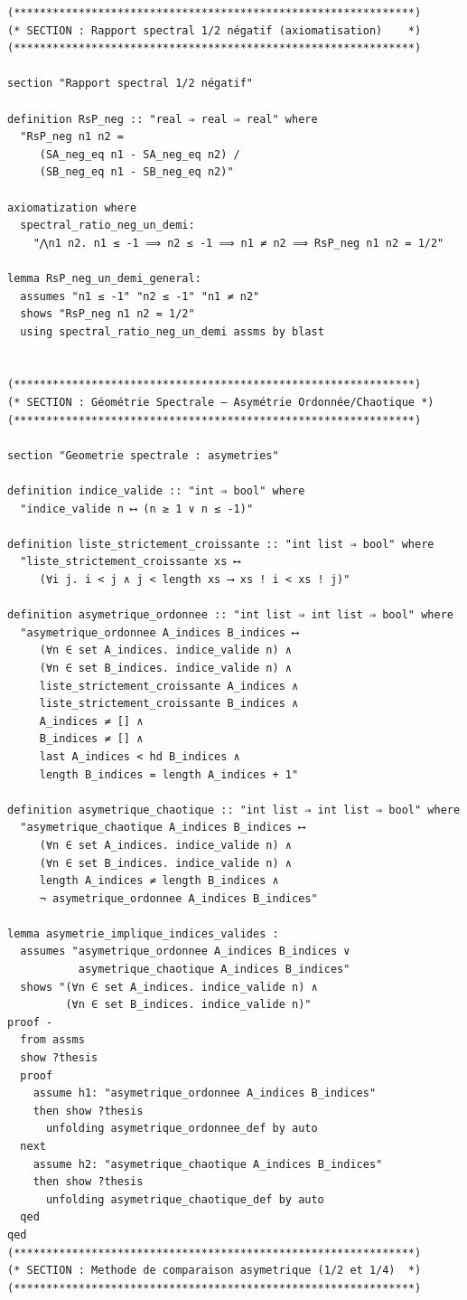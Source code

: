 \documentclass[a4paper,11pt]{article}
\begin{document}
\begin{holcode}[title={\textcolor{white}{File: methode\_spectral.thy -- Part 1/4}}]
\begin{lstlisting}
(**************************************************************)
(* SECTION : Rapport spectral 1/2 négatif (axiomatisation)    *)
(**************************************************************)

section "Rapport spectral 1/2 négatif"

definition RsP_neg :: "real ⇒ real ⇒ real" where
  "RsP_neg n1 n2 =
     (SA_neg_eq n1 - SA_neg_eq n2) /
     (SB_neg_eq n1 - SB_neg_eq n2)"

axiomatization where
  spectral_ratio_neg_un_demi:
    "⋀n1 n2. n1 ≤ -1 ⟹ n2 ≤ -1 ⟹ n1 ≠ n2 ⟹ RsP_neg n1 n2 = 1/2"

lemma RsP_neg_un_demi_general:
  assumes "n1 ≤ -1" "n2 ≤ -1" "n1 ≠ n2"
  shows "RsP_neg n1 n2 = 1/2"
  using spectral_ratio_neg_un_demi assms by blast


(**************************************************************)
(* SECTION : Géométrie Spectrale — Asymétrie Ordonnée/Chaotique *)
(**************************************************************)

section "Geometrie spectrale : asymetries"

definition indice_valide :: "int ⇒ bool" where
  "indice_valide n ⟷ (n ≥ 1 ∨ n ≤ -1)"

definition liste_strictement_croissante :: "int list ⇒ bool" where
  "liste_strictement_croissante xs ⟷
     (∀i j. i < j ∧ j < length xs ⟶ xs ! i < xs ! j)"

definition asymetrique_ordonnee :: "int list ⇒ int list ⇒ bool" where
  "asymetrique_ordonnee A_indices B_indices ⟷
     (∀n ∈ set A_indices. indice_valide n) ∧
     (∀n ∈ set B_indices. indice_valide n) ∧
     liste_strictement_croissante A_indices ∧
     liste_strictement_croissante B_indices ∧
     A_indices ≠ [] ∧
     B_indices ≠ [] ∧
     last A_indices < hd B_indices ∧
     length B_indices = length A_indices + 1"

definition asymetrique_chaotique :: "int list ⇒ int list ⇒ bool" where
  "asymetrique_chaotique A_indices B_indices ⟷
     (∀n ∈ set A_indices. indice_valide n) ∧
     (∀n ∈ set B_indices. indice_valide n) ∧
     length A_indices ≠ length B_indices ∧
     ¬ asymetrique_ordonnee A_indices B_indices"

lemma asymetrie_implique_indices_valides :
  assumes "asymetrique_ordonnee A_indices B_indices ∨
           asymetrique_chaotique A_indices B_indices"
  shows "(∀n ∈ set A_indices. indice_valide n) ∧
         (∀n ∈ set B_indices. indice_valide n)"
proof -
  from assms
  show ?thesis
  proof
    assume h1: "asymetrique_ordonnee A_indices B_indices"
    then show ?thesis
      unfolding asymetrique_ordonnee_def by auto
  next
    assume h2: "asymetrique_chaotique A_indices B_indices"
    then show ?thesis
      unfolding asymetrique_chaotique_def by auto
  qed
qed
(**************************************************************)
(* SECTION : Methode de comparaison asymetrique (1/2 et 1/4)  *)
(**************************************************************)


\end{lstlisting}
\end{holcode}
\end{document}
